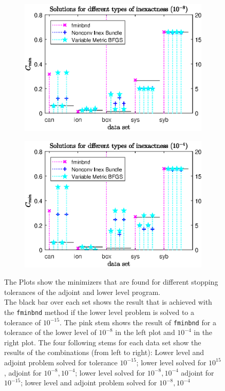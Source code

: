 \begin{figure}[ht]
	\begin{subfigure}{0.49\textwidth}
		\includegraphics[width=\textwidth]{Pictures/Plots/Scal100_llad-8C.eps}%
	\end{subfigure}
	\begin{subfigure}{0.49\textwidth}
		\includegraphics[width=\textwidth]{Pictures/Plots/Scal100_llad-4C.eps}%
	\end{subfigure}
	\caption[Minimizer for different stopping tolerances of the lower level and adjoint program]{The Plots show the minimizers that are found for different stopping tolerances of the adjoint and lower level program.\\
	The black bar over each set shows the result that is achieved with the \textup{\texttt{fminbnd}} method if the lower level problem is solved to a tolerance of \(10^{-15}\). The pink stem shows the result of \textup{\texttt{fminbnd}} for a tolerance of the lower level of \(10^{-8}\) in the left plot and \(10^{-4}\) in the right plot. The four following stems for each data set show the results of the combinations (from left to right): Lower level and adjoint problem solved for tolerance \(10^{-15}\); lower level solved for \(10^{15}\), adjoint for \(10^{-8}, 10^{-4}\); lower level solved for \(10^{-8},10^{-4}\) adjoint for \(10^{-15}\); lower level and adjoint problem solved for \(10^{-8},10^{-4}\)\\
}
\end{figure}

